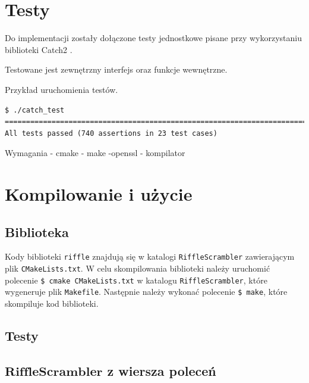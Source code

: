 \section{Testy}
Do implementacji zostały dołączone testy jednostkowe pisane przy wykorzystaniu biblioteki Catch2 \cite{catch}.

Testowane jest zewnętrzny interfejs oraz funkcje wewnętrzne.

Przykład uruchomienia testów.
\begin{lstlisting}
$ ./catch_test 
===============================================================================
All tests passed (740 assertions in 23 test cases)
\end{lstlisting}

Wymagania - cmake - make -openssl - kompilator

\section{Kompilowanie i użycie}
\subsection{Biblioteka}
Kody biblioteki \texttt{riffle} znajdują się w katalogi \texttt{RiffleScrambler} zawierającym 
plik \texttt{CMakeLists.txt}.
W celu skompilowania biblioteki należy uruchomić polecenie \texttt{\$ cmake CMakeLists.txt} w katalogu \texttt{RiffleScrambler}, które wygeneruje plik \texttt{Makefile}. Następnie należy wykonać polecenie \texttt{\$ make}, które skompiluje kod biblioteki.


\subsection{Testy}

\subsection{$\mathbf{RiffleScrambler}$ z wiersza poleceń}

